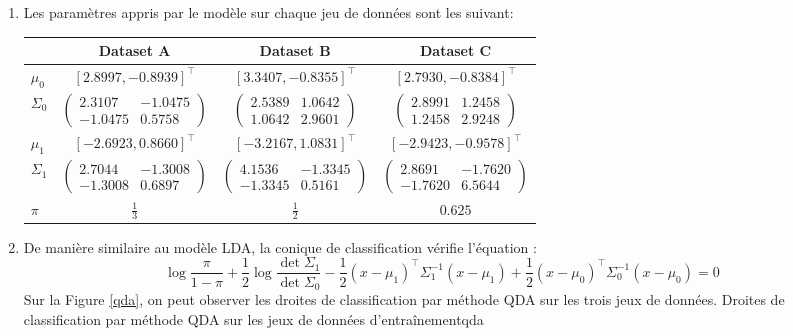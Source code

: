 \documentclass{article}
\begin{document}
\begin{enumerate}[label=(\alph*)]
\item Les paramètres appris par le modèle sur chaque jeu de données sont les suivant:
\begin{center}
\begin{tabular}{|l|c|c|c|}
\hline
    & Dataset A & Dataset B & Dataset C\\
\hline
$\mu_0$ & $[2.8997, -0.8939]^\intercal$ & $[3.3407, -0.8355]^\intercal$& $[2.7930, -0.8384]^\intercal$\\
\hline
$\Sigma_0$ & $\begin{pmatrix}2.3107&-1.0475\\-1.0475&0.5758\end{pmatrix}$ & $\begin{pmatrix}2.5389&1.0642\\1.0642&2.9601\end{pmatrix}$ & $\begin{pmatrix}2.8991&1.2458\\1.2458&2.9248\end{pmatrix}$\\
\hline
$\mu_1$ & $[-2.6923,  0.8660]^\intercal$ & $[-3.2167, 1.0831]^\intercal$& $[-2.9423, -0.9578]^\intercal$\\
\hline
$\Sigma_1$ & $\begin{pmatrix}2.7044&-1.3008\\-1.3008&0.6897\end{pmatrix}$ & $\begin{pmatrix}4.1536&-1.3345\\-1.3345&0.5161\end{pmatrix}$ & $\begin{pmatrix}2.8691&-1.7620\\-1.7620&6.5644\end{pmatrix}$\\
\hline
$\pi$ & $\frac{1}{3}$ & $\frac{1}{2}$ & $0.625$\\
\hline
\end{tabular}
\end{center}

\item De manière similaire au modèle LDA, la conique de classification vérifie l'équation :
$$
\log \frac{\pi}{1 - \pi} + \frac{1}{2}\log\frac{\det \Sigma_1}{\det \Sigma_0} - \frac{1}{2}(x-\mu_1)^\intercal\Sigma_1^{-1}(x-\mu_1) + \frac{1}{2}(x-\mu_0)^\intercal\Sigma_0^{-1}(x-\mu_0) = 0
$$
Sur la Figure \ref{qda}, on peut observer les droites de classification par méthode QDA sur les trois jeux de données.
          {}
          {}
          {Droites de classification par méthode QDA sur les jeux de données d'entraînement}{qda}


\end{enumerate}
\end{document}
